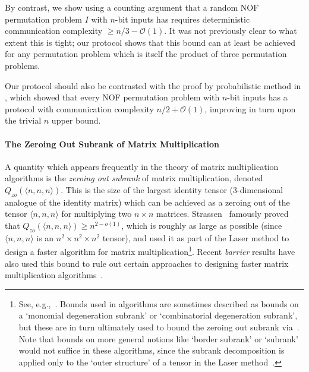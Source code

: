 \documentclass[10pt,a4paper]{article}
\newcommand{\Oh}{\mathcal{O}}
\newcommand{\jnote}[1]{\todo[inline, color=blue!30!white]{#1 \\ -\textsc{Jarek}}}
\begin{document}
    By contrast, we show using a counting argument that a random NOF permutation problem $I$ with $n$-bit inputs has requires deterministic communication complexity $\geq n/3 - \Oh(1)$. It was not previously clear to what extent this is tight; our protocol shows that this bound can at least be achieved for any permutation problem which is itself the product of three permutation problems.
    
    Our protocol should also be contrasted with the proof by probabilistic method in \cite{CFTZ21}, which showed that every NOF permutation problem with $n$-bit inputs has a protocol with communication complexity $n/2 + \Oh(1)$, improving in turn upon the trivial $n$ upper bound.
    
    
    \paragraph{The Zeroing Out Subrank of Matrix Multiplication}
    A quantity which appears frequently in the theory of matrix multiplication algorithms is the \emph{zeroing out subrank} of matrix multiplication, denoted $Q_{zo}(\langle n,n,n \rangle)$. This is the size of the largest identity tensor (3-dimensional analogue of the identity matrix) which can be achieved as a zeroing out of the tensor $\langle n,n,n \rangle$ for multiplying two $n \times n$ matrices. Strassen~\cite{S86} famously proved that $Q_{zo}(\langle n,n,n \rangle) \geq n^{2 - o(1)}$, which is roughly as large as possible (since $\langle n,n,n \rangle$ is an $n^2 \times n^2 \times n^2$ tensor), and used it as part of the Laser method to design a faster algorithm for matrix multiplication\footnote{See, e.g.,~\cite[Section 8]{B13}. Bounds used in algorithms are sometimes described as bounds on a `monomial degeneration subrank' or `combinatorial degeneration subrank', but these are in turn ultimately used to bound the zeroing out subrank via~\cite{B80}. Note that bounds on more general notions like `border subrank' or `subrank' would not suffice in these algorithms, since the subrank decomposition is applied only to the `outer structure' of a tensor in the Laser method~\cite{S86}.}. Recent \emph{barrier} results have also used this bound to rule out certain approaches to designing faster matrix multiplication algorithms~\cite{AW21,A21,CVZ21}.
\end{document}
